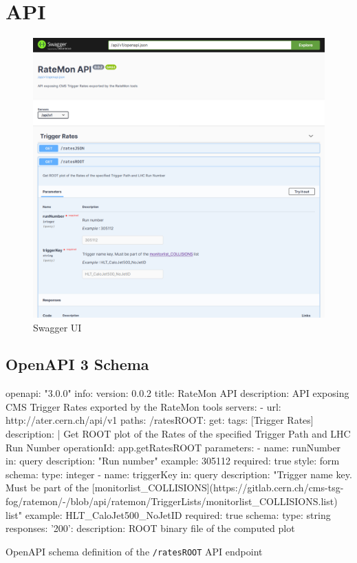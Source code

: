 \section{API}

\begin{figure}
    \centerline{
        \includegraphics[width=0.8\paperwidth]{figures/swagger-ui}}
    \caption{Swagger UI}
    \label{fig:swagger-ui}
\end{figure}

\subsection{OpenAPI 3 Schema}

\begin{listing}[ht]
\begin{yamlcode}
openapi: "3.0.0"
info:
  version: 0.0.2
  title: RateMon API
  description: API exposing CMS Trigger Rates exported by the RateMon tools
servers:
  - url: http://ater.cern.ch/api/v1
paths:
  /ratesROOT:
    get:
      tags: [Trigger Rates]
      description: |
        Get ROOT plot of the Rates of the specified Trigger Path and LHC Run Number
      operationId: app.getRatesROOT
      parameters:
        - name: runNumber
          in: query
          description: "Run number"
          example: 305112
          required: true
          style: form
          schema:
            type: integer
        - name: triggerKey
          in: query
          description: "Trigger name key. Must be part of the [monitorlist_COLLISIONS](https://gitlab.cern.ch/cms-tsg-fog/ratemon/-/blob/api/ratemon/TriggerLists/monitorlist_COLLISIONS.list) list"
          example: HLT_CaloJet500_NoJetID
          required: true
          schema:
            type: string
      responses:
        '200':
          description: ROOT binary file of the computed plot
\end{yamlcode}
\caption{OpenAPI schema definition of the \texttt{/ratesROOT} API endpoint}
\end{listing}

